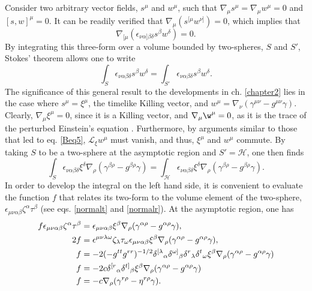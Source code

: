 \documentclass[
12pt,		%
openright,	%
twoside,  %
a4paper,			%
chapter=TITLE,		%
english,			%
french,				%
spanish,			%
brazil				%
]{USPSC-classe/USPSC}
\begin{document}
\begin{apendicesenv}
Consider two arbitrary vector fields, $s^{\mu}$ and $w^{\mu}$, such that $\nabla_{\mu}s^{\mu}=\nabla_{\mu}w^{\mu}=0$ and $[s,w]^{\mu}=0$. It can be readily verified that $\nabla_{\mu}(s^{[\mu}w^{\nu]})=0$, which implies that \cite{Wald1984}
\begin{equation} 
    \nabla_{[\mu}(\epsilon_{\nu\alpha]\beta\delta}s^{\beta}w^{\delta})=0.
\end{equation}
By integrating this three-form over a volume bounded by two-spheres, $S$ and $S'$, Stokes' theorem allows one to write
\begin{equation}
    \int_S\epsilon_{\nu\alpha\beta\delta}s^{\beta}w^{\delta}=\int_{S'}\epsilon_{\nu\alpha\beta\delta}s^{\beta}w^{\delta}.
\end{equation}
The significance of this general result to the developments in ch. \ref{chapter2} lies in the case where $s^{\mu}=\xi^{\mu}$, the timelike Killing vector, and $w^{\mu}=\nabla_{\nu}(\gamma^{\mu\nu}-g^{\mu\nu}\gamma)$. Clearly, $\nabla_{\mu}\xi^{\mu}=0$, since it is a Killing vector, and $\nabla_{\mu}\w^{\mu}=0$, as it is the trace of the perturbed Einstein's equation \cite{Wald1984}. Furthermore, by arguments similar to those that led to eq. \ref{Beq5}, $\mathcal{L}_{\xi}w^{\mu}$ must vanish, and thus,  $\xi^{\mu}$ and $w^{\mu}$ commute. By taking $S$ to be a two-sphere at the asymptotic region and $S'=\mathscr{H}$, one then finds
\begin{equation}\label{generalresult}
    \int_S\epsilon_{\nu\alpha\beta\delta}\xi^{\delta}\nabla_{\rho}(\gamma^{\beta\rho}-g^{\beta\rho}\gamma)=\int_{\mathscr{H}}\epsilon_{\nu\alpha\beta\delta}\xi^{\delta}\nabla_{\rho}(\gamma^{\beta\rho}-g^{\beta\rho}\gamma).
\end{equation}
In order to develop the integral on the left hand side, it is convenient to evaluate the function $f$ that relates its two-form to the volume element of the two-sphere, $\epsilon_{\mu\nu\alpha\beta}\zeta^{\alpha}\tau^{\beta}$ (see eqs. \ref{normalt} and \ref{normalr}). At the asymptotic region, one has
\begin{equation}
\begin{aligned}[b]
f\epsilon_{\mu\nu\alpha\beta}\zeta^{\alpha}\tau^{\beta} &=\epsilon_{\mu\nu\alpha\beta}\xi^{\beta}\nabla_{\rho}(\gamma^{\alpha\rho}-g^{\alpha\rho}\gamma), \\
 2f&=\epsilon^{\mu\nu\lambda\omega}\zeta_{\lambda}\tau_{\omega}\epsilon_{\mu\nu\alpha\beta}\xi^{\beta}\nabla_{\rho}(\gamma^{\alpha\rho}-g^{\alpha\rho}\gamma),\\
 f&=-2(-g^{tt}g^{rr})^{-1/2}\delta^{[\lambda}\mathstrut_{\alpha}\delta^{\omega]}\mathstrut_{\beta}\delta^{r}\mathstrut_{\lambda}\delta^{t}\mathstrut_{\omega}\xi^{\beta}\nabla_{\rho}(\gamma^{\alpha\rho}-g^{\alpha\rho}\gamma)\\
 f&=-2c\delta^{[r}\mathstrut_{\alpha}\delta^{t]}\mathstrut_{\beta}\xi^{\beta}\nabla_{\rho}(\gamma^{\alpha\rho}-g^{\alpha\rho}\gamma)\\
 f&=-c\nabla_{\rho}(\gamma^{r\rho}-\eta^{r\rho}\gamma).
\end{aligned}    
\end{equation}


\end{apendicesenv}
\end{document}
